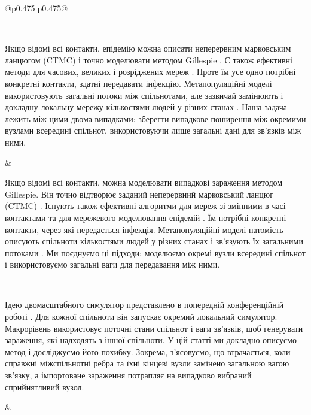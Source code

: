 ﻿\documentclass[11pt]{article}
\begin{document}
\begin{longtable}{@{}p{0.475\textwidth}|p{0.475\textwidth}@{}}
\begin{minipage}[t]{\linewidth}
\end{minipage} \\[5mm]
\begin{minipage}[t]{\linewidth}
Якщо відомі всі контакти, епідемію можна описати неперервним марковським ланцюгом (CTMC) і точно моделювати методом Gillespie \citep{gillespie1977exact,gibson2000}. Є також ефективні методи для часових, великих і розріджених мереж \citep{vestergaard2015,kuryliak2025simulating}. Проте їм усе одно потрібні конкретні контакти, здатні передавати інфекцію. Метапопуляційні моделі використовують загальні потоки між спільнотами, але зазвичай замінюють і докладну локальну мережу кількостями людей у різних станах \citep{colizza2007reaction,colizza2008,balcan2010modeling,ajelli2010}. Наша задача лежить між цими двома випадками: зберегти випадкове поширення між окремими вузлами всередині спільнот, використовуючи лише загальні дані для зв'язків між ними.
\end{minipage} &
\begin{minipage}[t]{\linewidth}
Якщо відомі всі контакти, можна моделювати випадкові зараження методом Gillespie. Він точно відтворює заданий неперервний марковський ланцюг (CTMC) \citep{gillespie1977exact,gibson2000}. Існують також ефективні алгоритми для мереж зі змінними в часі контактами та для мережевого моделювання епідемій \citep{vestergaard2015,kuryliak2025simulating}. Їм потрібні конкретні контакти, через які передається інфекція. Метапопуляційні моделі натомість описують спільноти кількостями людей у різних станах і зв'язують їх загальними потоками \citep{colizza2007reaction,colizza2008,balcan2010modeling,ajelli2010}. Ми поєднуємо ці підходи: моделюємо окремі вузли всередині спільнот і використовуємо загальні ваги для передавання між ними.
\end{minipage} \\[5mm]
\begin{minipage}[t]{\linewidth}
Ідею двомасштабного симулятор представлено в попередній конференційній роботі \citep{kuryliak2025towards}. Для кожної спільноти він запускає окремий локальний симулятор. Макрорівень використовує поточні стани спільнот і ваги зв'язків, щоб генерувати зараження, які надходять з іншої спільноти. У цій статті ми докладно описуємо метод і досліджуємо його похибку. Зокрема, з'ясовуємо, що втрачається, коли справжні міжспільнотні ребра та їхні кінцеві вузли замінено загальною вагою зв'язку, а імпортоване зараження потрапляє на випадково вибраний сприйнятливий вузол.
\end{minipage} &
\begin{minipage}[t]{\linewidth}

\end{minipage}
\end{longtable}
\end{document}
